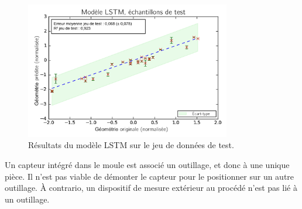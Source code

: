 \begin{figure}[bthp]
	\centering
	\includegraphics[width=0.8\textwidth]{../Chap2/Figures/1LSTM_Cross_val_MSE_013splited_Ystd.png}
	\caption{Résultats du modèle LSTM sur le jeu de données de test.}
	\label{fig:signals_lstm}
\end{figure}


Un capteur intégré dans le moule est associé un outillage, et donc à une unique pièce.
Il n'est pas viable de démonter le capteur pour le positionner sur un autre outillage.
À contrario, un dispositif de mesure extérieur au procédé n'est pas lié à un outillage.

